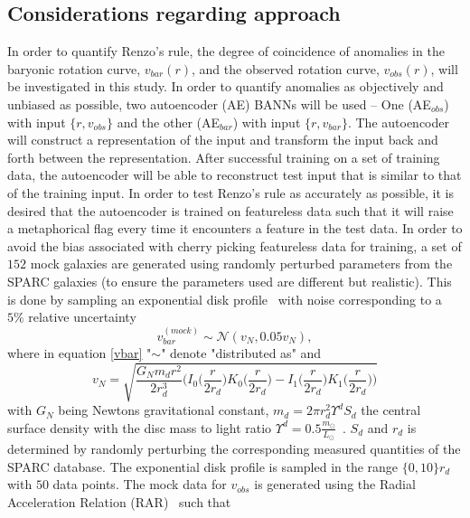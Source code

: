 \begin{example}
	\section{Considerations regarding approach}
	In order to quantify Renzo's rule, the degree of coincidence of anomalies in the baryonic rotation curve, $v_{bar}(r)$, and the observed rotation curve, $v_{obs}(r)$, will be investigated in this study. In order to quantify anomalies as objectively and unbiased as possible, two autoencoder (AE) BANNs will be used -- One (AE$_{obs}$) with input $\{r,v_{obs}\}$ and the other (AE$_{bar}$) with input $\{r,v_{bar}\}$. The autoencoder will construct a representation of the input and transform the input back and forth between the representation. After successful training on a set of training data, the autoencoder will be able to reconstruct test input that is similar to that of the training input. In order to test Renzo's rule as accurately as possible, it is desired that the autoencoder is trained on featureless data such that it will raise a metaphorical flag every time it encounters a feature in the test data. In order to avoid the bias associated with cherry picking featureless data for training, a set of $152$ mock galaxies are generated using randomly perturbed parameters from the SPARC galaxies (to ensure the parameters used are different but realistic). This is done by sampling an exponential disk profile~\cite{binney} with noise corresponding to a $5\%$ relative uncertainty
	\begin{equation}
		v_{bar}^{(mock)} \sim \mathcal{N}(v_N,0.05v_N),
		\label{vbar}
	\end{equation}
	where in equation \eqref{vbar} "$\sim$" denote "distributed as" and
	\begin{equation}
		v_N= \sqrt{\frac{G_Nm_dr^2}{2r_d^3}\bigg(I_{0}\bigg(\frac{r}{2r_d}\bigg)K_{0}\bigg(\frac{r}{2r_d}\bigg)-I_{1}\bigg(\frac{r}{2r_d}\bigg)K_{1}\bigg(\frac{r}{2r_d}\bigg)\bigg)}
		\label{vn}
	\end{equation}
	with $G_N$ being Newtons gravitational constant,  $m_d=2\pi r_d^2\Upsilon^{d} S_d$ the central surface density with the disc mass to light ratio $\Upsilon^{d}=0.5\frac{m_\odot}{L_\odot}$~\cite{Lelli:2017vgz}. $S_d$ and $r_d$ is determined by randomly perturbing the corresponding measured quantities of the SPARC database. The exponential disk profile is sampled in the range $\{0,10\}r_d$ with $50$ data points. The mock data for $v_{obs}$ is generated using the Radial Acceleration Relation (RAR)~\cite{McGaugh:2016leg} such that
	\begin{equation}

\end{equation}
\end{example}
